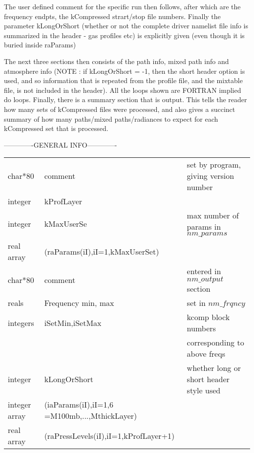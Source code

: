 \documentclass[12pt]{article}
\newlength{\colwidth}
\begin{document}
{{{{\medskip
The user defined comment for the specific run then follows, after
which are the frequency endpts, the kCompressed strart/stop file
numbers.  Finally the parameter {\sf kLongOrShort} (whether or not the 
complete driver namelist file info is summarized in the header - gas profiles 
etc) is explicitly given (even though it is buried inside raParams)


The next three sections then consists of the path info, mixed path
info and atmosphere info (NOTE : if {\sf kLongOrShort} = -1, then
the short header option is used, and so information that is repeated
from the profile file, and the mixtable file, is not included in the
header). All the loops shown are FORTRAN implied do loops. Finally, there 
is a summary section that is output. This tells the reader how many sets
of kCompressed files were processed, and also gives a succinct summary of how 
many paths/mixed paths/radiances to expect for each kCompressed set that is 
processed.

-------------GENERAL INFO-------------\\
\begin{small}
\begin{longtable}{llp{\colwidth}}
{\sf char*80}    & comment & set by program, giving version number\\
{\sf integer}    & kProfLayer & \\
{\sf integer}    & kMaxUserSe & max number of params in $nm\_params$\\
{\sf real array} & (raParams(iI),iI=1,kMaxUserSet) & \\
{\sf char*80}    & comment & entered in $nm\_output$ section\\
{\sf reals}      & Frequency min, max &set in $nm\_frqncy$\\
{\sf integers}   & iSetMin,iSetMax  & kcomp block numbers \\
                 &                  & corresponding to above freqs \\
{\sf integer}    & kLongOrShort & whether long or short header style used\\
{\sf integer array} & (iaParams(iI),iI=1,6 =M100mb,...,MthickLayer)& \\
{\sf real array} & (raPressLevels(iI),iI=1,kProfLayer+1) & \\
\end{longtable}
\end{small}

}}}}
\end{document}

